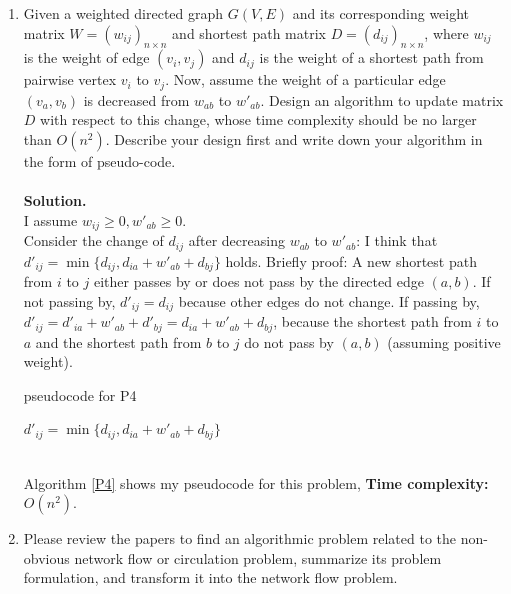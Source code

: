 \documentclass{article}
\begin{document}
\begin{enumerate}
\item Given a weighted directed graph $G(V, E)$ and its corresponding weight matrix $W=(w_{ij})_{n \times n}$ and shortest path matrix $D=(d_{ij})_{n \times n}$, where $w_{ij}$ is the weight of edge $(v_i, v_j)$ and $d_{ij}$ is the weight of a shortest path from pairwise vertex $v_i$ to $v_j$. Now, assume the weight of a particular edge $(v_a, v_b)$ is decreased from $w_{ab}$ to $w'_{ab}$. Design an algorithm to update matrix $D$ with respect to this change, whose time complexity should be no larger than $O(n^2)$. Describe your design first and write down your algorithm in the form of pseudo-code.
~\\~\\
\textbf{Solution.}~\\
I assume $w_{ij}\geq0, w'_{ab}\geq0$.\\
Consider the change of $d_{ij}$ after decreasing $w_{ab}$ to $w'_{ab}$: I think that $d'_{ij}=\min \{d_{ij}, d_{ia}+w'_{ab}+d_{bj}\}$ holds. Briefly proof: A new shortest path from $i$ to $j$ either passes by or does not pass by the directed edge $(a,b)$. If not passing by, $d'_{ij}=d_{ij}$ because other edges do not change. If passing by, $d'_{ij} = d'_{ia} + w'_{ab} + d'_{bj} = d_{ia} + w'_{ab} + d_{bj}$, because the shortest path from $i$ to $a$ and the shortest path from $b$ to $j$ do not pass by $(a,b)$ (assuming positive weight).
~\\
\begin{minipage}[htb]{0.9\textwidth}
\begin{algorithm}[H]
\caption{pseudocode for P4}
\label{P4}
\begin{algorithmic}[1]
            \State $d'_{ij}=\min\{d_{ij}, d_{ia}+w'_{ab}+d_{bj}\}$
        \EndFor
        \State {}
    \EndFunction
\end{algorithmic}
\end{algorithm}
\end{minipage}
~\\
Algorithm \ref{P4} shows my pseudocode for this problem, \textbf{Time complexity:} $O(n^2)$.
\item  Please review the papers to find an algorithmic problem related to the non-obvious network flow or circulation problem, summarize its problem formulation, and transform it into the network flow problem.
    

\end{enumerate}
\end{document}
